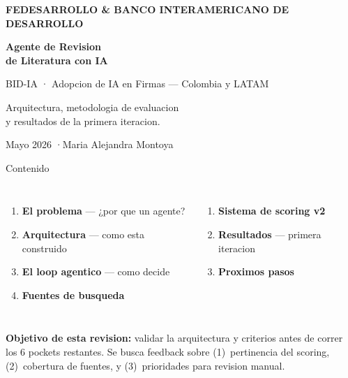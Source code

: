 \documentclass[aspectratio=169,10pt]{beamer}
\newenvironment{card}[1][cardbg]{%
  \begin{tcolorbox}[colback=#1,colframe=bidlight!40,arc=4pt,
    boxrule=0.4pt,left=5pt,right=5pt,top=4pt,bottom=4pt]}%
  {\end{tcolorbox}}
\begin{document}

{
\begin{frame}[plain]
\vspace{10mm}\hspace{7mm}%
\begin{minipage}{0.76\textwidth}
  {\tiny\color{bidaccent}\bfseries FEDESARROLLO \& BANCO INTERAMERICANO DE DESARROLLO}
  \vspace{4mm}

  {\huge\bfseries\color{white}Agente de Revision\\[3pt]de Literatura con IA}
  \vspace{5mm}

  {\large\color{bidaccent}BID-IA · Adopcion de IA en Firmas — Colombia y LATAM}
  \vspace{6mm}

  \textcolor{bidgray!80}{\small
    Arquitectura, metodologia de evaluacion\\
    y resultados de la primera iteracion.}
  \vspace{8mm}

  \textcolor{bidgray!50}{\footnotesize Mayo 2026 \quad·\quad Maria Alejandra Montoya}
\end{minipage}
\end{frame}
}

\begin{frame}{Contenido}
\begin{columns}[T]
\begin{enumerate}\setlength\itemsep{6pt}
  \item[\textcolor{bidaccent}{1.}] \textbf{El problema} --- ¿por que un agente?
  \item[\textcolor{bidaccent}{2.}] \textbf{Arquitectura} --- como esta construido
  \item[\textcolor{bidaccent}{3.}] \textbf{El loop agentico} --- como decide
  \item[\textcolor{bidaccent}{4.}] \textbf{Fuentes de busqueda}
\end{enumerate}
\begin{enumerate}\setlength\itemsep{6pt}
  \item[\textcolor{bidaccent}{5.}] \textbf{Sistema de scoring v2}
  \item[\textcolor{bidaccent}{6.}] \textbf{Resultados} --- primera iteracion
  \item[\textcolor{bidaccent}{7.}] \textbf{Proximos pasos}
\end{enumerate}
\end{columns}
\vspace{7mm}
\begin{card}
\small\color{bidgray}
\textbf{\color{bidaccent}Objetivo de esta revision:} validar la arquitectura y criterios antes de correr los 6 pockets restantes. Se busca feedback sobre (1)~pertinencia del scoring, (2)~cobertura de fuentes, y (3)~prioridades para revision manual.
\end{card}
\end{frame}
\end{document}
